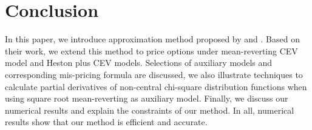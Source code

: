 \chapter{Conclusion}\label{ch5}

In this paper, we introduce approximation method proposed by \cite{david_variance_nodate} and \cite{kristensen_adding_2011}. Based on their work, we extend this method to price options under mean-reverting CEV model and Heston plus CEV models. Selections of auxiliary models and corresponding mis-pricing formula are discussed, we also illustrate techniques to calculate partial derivatives of non-central chi-square distribution functions when using square root mean-reverting as auxiliary model. Finally, we discuss our numerical results and explain the constraints of our method. In all, numerical results show that our method is efficient and accurate.